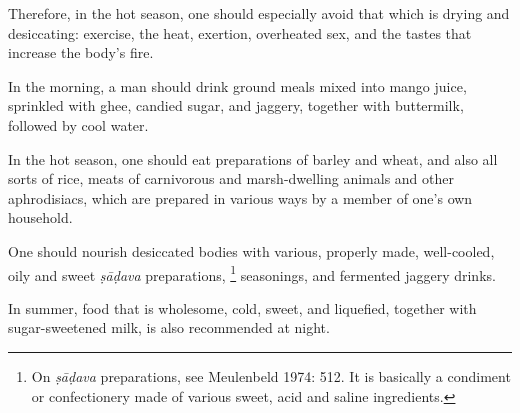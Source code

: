 \begin{translation}
	\item[51]
	Therefore, in the hot season, one should especially avoid that which is drying and desiccating: %
	exercise, the heat, exertion, overheated sex, %
	and the tastes that increase the body's fire. %

	\item[52]
	In the morning, a man should drink ground meals  %
	mixed into mango juice, %
	sprinkled with %
	ghee, candied sugar, %
	and jaggery, %
	together with buttermilk, %
	followed by cool water. %

	\item[53]
	In the hot season, %
	one should eat preparations %
	of barley and wheat, and also all sorts of rice, %
	meats of carnivorous and marsh-dwelling animals %
	and other aphrodisiacs, %
	which are prepared in various ways %
	by a member of one's own household. %

	\item[54]
	One should nourish %
	desiccated bodies %
	with various, properly made, %
	well-cooled, %
	oily and sweet %
	\emph{ṣāḍava} preparations, %
	\footnote{On \emph{ṣāḍava} preparations, see Meulenbeld 1974: 512. It is basically a condiment or confectionery made of various sweet, acid and saline ingredients.}
	seasonings, %
	and fermented jaggery drinks. %

	\item[55]
	In summer, food that is wholesome, cold, sweet, and liquefied, %
	together with sugar-sweetened milk, %
	is also recommended at night.


\end{translation}
